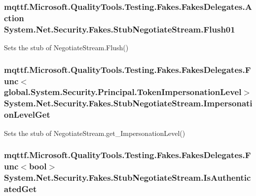 \hypertarget{class_system_1_1_net_1_1_security_1_1_fakes_1_1_stub_negotiate_stream_a8b4b356d74be5d276b522c82b5c88733}{
\subsubsection[{Flush01}]{\setlength{\rightskip}{0pt plus 5cm}mqttf.\-Microsoft.\-Quality\-Tools.\-Testing.\-Fakes.\-Fakes\-Delegates.\-Action System.\-Net.\-Security.\-Fakes.\-Stub\-Negotiate\-Stream.\-Flush01}}\label{class_system_1_1_net_1_1_security_1_1_fakes_1_1_stub_negotiate_stream_a8b4b356d74be5d276b522c82b5c88733}


Sets the stub of Negotiate\-Stream.\-Flush()

\hypertarget{class_system_1_1_net_1_1_security_1_1_fakes_1_1_stub_negotiate_stream_a0561ce299850970805b4032d69f3db25}{
\subsubsection[{Impersonation\-Level\-Get}]{\setlength{\rightskip}{0pt plus 5cm}mqttf.\-Microsoft.\-Quality\-Tools.\-Testing.\-Fakes.\-Fakes\-Delegates.\-Func$<$global.\-System.\-Security.\-Principal.\-Token\-Impersonation\-Level$>$ System.\-Net.\-Security.\-Fakes.\-Stub\-Negotiate\-Stream.\-Impersonation\-Level\-Get}}\label{class_system_1_1_net_1_1_security_1_1_fakes_1_1_stub_negotiate_stream_a0561ce299850970805b4032d69f3db25}


Sets the stub of Negotiate\-Stream.\-get\-\_\-\-Impersonation\-Level()

\hypertarget{class_system_1_1_net_1_1_security_1_1_fakes_1_1_stub_negotiate_stream_a72ef3004ac2b358e3d5cc2b54fe32cd5}{
\subsubsection[{Is\-Authenticated\-Get}]{\setlength{\rightskip}{0pt plus 5cm}mqttf.\-Microsoft.\-Quality\-Tools.\-Testing.\-Fakes.\-Fakes\-Delegates.\-Func$<$bool$>$ System.\-Net.\-Security.\-Fakes.\-Stub\-Negotiate\-Stream.\-Is\-Authenticated\-Get}}\label{class_system_1_1_net_1_1_security_1_1_fakes_1_1_stub_negotiate_stream_a72ef3004ac2b358e3d5cc2b54fe32cd5}


